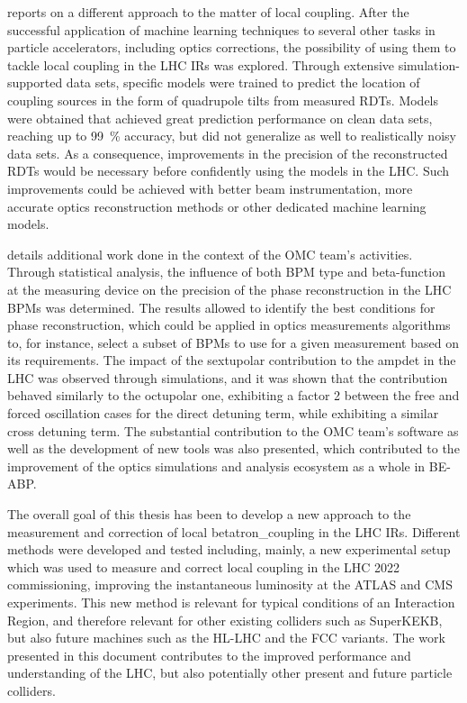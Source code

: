  reports on a different approach to the matter of local coupling.
After the successful application of machine learning techniques to several other tasks in particle accelerators, including optics corrections, the possibility of using them to tackle local coupling in the \gls{LHC} \glspl{IR} was explored.
Through extensive simulation-supported data sets, specific models were trained to predict the location of coupling sources in the form of quadrupole tilts from measured \glspl{RDT}.
Models were obtained that achieved great prediction performance on clean data sets, reaching up to \qty{99}{\percent} accuracy, but did not generalize as well to realistically noisy data sets.
As a consequence, improvements in the precision of the reconstructed \glspl{RDT} would be necessary before confidently using the models in the \gls{LHC}.
Such improvements could be achieved with better beam instrumentation, more accurate optics reconstruction methods or other dedicated machine learning models.
\break

 details additional work done in the context of the \gls{OMC} team's activities.
Through statistical analysis, the influence of both \gls{BPM} type and \gls{beta-function} at the measuring device on the precision of the phase reconstruction in the \gls{LHC} \glspl{BPM} was determined.
The results allowed to identify the best conditions for phase reconstruction, which could be applied in optics measurements algorithms to, for instance, select a subset of \glspl{BPM} to use for a given measurement based on its requirements.
The impact of the sextupolar contribution to the \gls{ampdet} in the \gls{LHC} was observed through simulations, and it was shown that the contribution behaved similarly to the octupolar one, exhibiting a factor \num{2} between the free and forced oscillation cases for the direct detuning term, while exhibiting a similar cross detuning term.
The substantial contribution to the \gls{OMC} team's software as well as the development of new tools was also presented, which contributed to the improvement of the optics simulations and analysis ecosystem as a whole in \acrshort{BE}-\acrshort{ABP}.
\break

The overall goal of this thesis has been to develop a new approach to the measurement and correction of local \gls{betatron_coupling} in the \gls{LHC} \glspl{IR}.
Different methods were developed and tested including, mainly, a new experimental setup which was used to measure and correct local coupling in the \gls{LHC} \num{2022} commissioning, improving the instantaneous luminosity at the \acrshort{ATLAS} and \acrshort{CMS} \glspl{experiment}.
This new method is relevant for typical conditions of an Interaction Region, and therefore relevant for other existing colliders such as SuperKEKB, but also future machines such as the \gls{HL-LHC} and the \gls{FCC} variants.
The work presented in this document contributes to the improved performance and understanding of the \gls{LHC}, but also potentially other present and future particle colliders.

